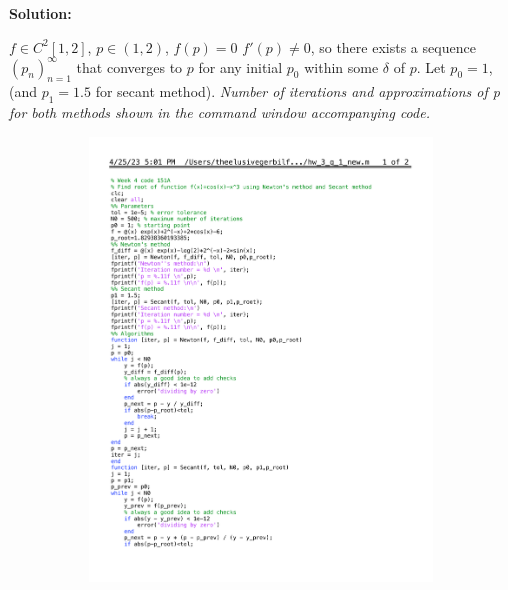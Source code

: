 \documentclass[12pt]{article}
\begin{document}
\begin{enumerate}[label=\bfseries Problem \arabic*:]
\vspace{1em}
\textbf{Solution:}\par 
$f\in C^2[1,2]$, $p\in(1,2)$, $f(p)=0$ $f'(p)\neq0$, so there exists a sequence $(p_n)^{\infty}_{n=1}$ that converges to $p$ for any initial $p_0$ within some $\delta$ of $p$. Let $p_0=1$, (and $p_1=1.5$ for secant method). \textit{Number of iterations and approximations of p for both methods shown in the command window accompanying code.} \par 
\begin{figure}[H]
  \begin{subfigure}[t!]{.5\textwidth}
  \includegraphics[clip, trim=0 2.1cm 0 0, page=1, width=\linewidth]{Newton_hw_3_q_1_new.pdf} 

\end{subfigure}
\end{figure}
\end{enumerate}
\end{document}
